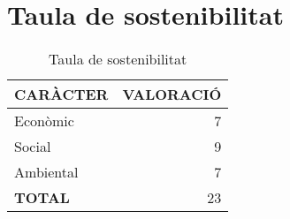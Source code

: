 
\section{Taula de sostenibilitat}

\begin{table}[H]
\centering
\begin{tabular}{ | l | r |}
\hline
\textbf{CARÀCTER}								&\textbf{VALORACIÓ}		\\ \hline
Econòmic										& 7						\\ \hline
Social											& 9						\\ \hline
Ambiental										& 7						\\ \hline
\textbf{TOTAL}					 				& 23					\\ 
\hline
\end{tabular}
\caption{Taula de sostenibilitat}
\end{table}